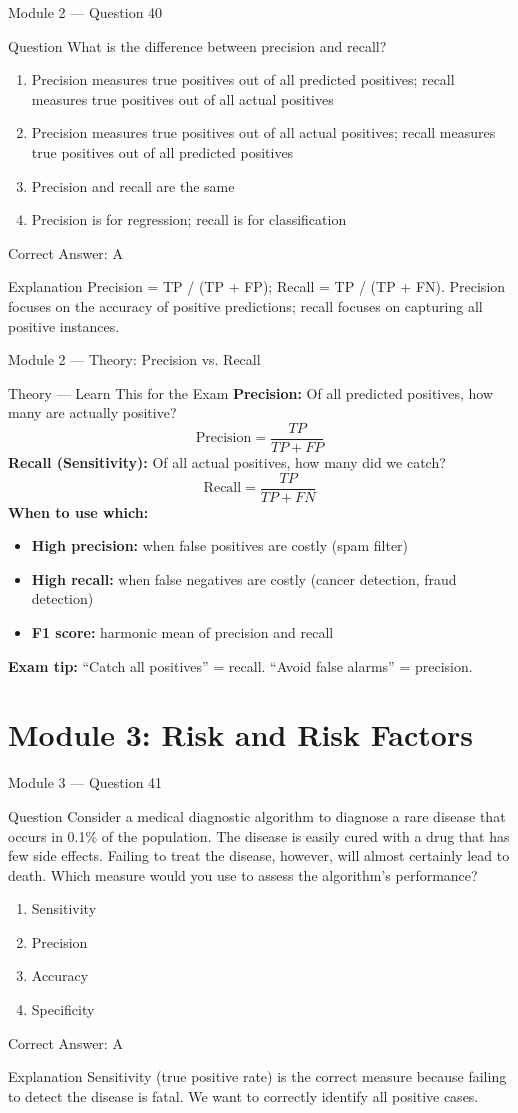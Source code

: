 \documentclass[aspectratio=169,10pt]{beamer}
\newcommand{\question}[1]{%
	\begin{block}{Question}
		#1
	\end{block}
}
\newcommand{\options}[4]{%
	\begin{enumerate}[label=\Alph*.,leftmargin=*]
		\item #1
		\item #2
		\item #3
		\item #4
	\end{enumerate}
}
\newcommand{\answerbox}[1]{%
	\begin{exampleblock}{Correct Answer: #1}
	\end{exampleblock}
}
\newcommand{\explain}[1]{%
	\begin{block}{Explanation}
		\small #1
	\end{block}
}
\newcommand{\theory}[1]{%
	\begin{block}{Theory --- Learn This for the Exam}
		\small #1
	\end{block}
}
\begin{document}
	\begin{frame}{Module 2 --- Question 40}
		\question{What is the difference between precision and recall?}
		\options{Precision measures true positives out of all predicted positives; recall measures true positives out of all actual positives}{Precision measures true positives out of all actual positives; recall measures true positives out of all predicted positives}{Precision and recall are the same}{Precision is for regression; recall is for classification}
		\answerbox{A}
		\explain{Precision = TP / (TP + FP); Recall = TP / (TP + FN). Precision focuses on the accuracy of positive predictions; recall focuses on capturing all positive instances.}
	\end{frame}
	
	\begin{frame}{Module 2 --- Theory: Precision vs. Recall}
		\theory{
			\textbf{Precision:} Of all predicted positives, how many are actually positive?
			\[
			\text{Precision} = \frac{TP}{TP + FP}
			\]
			\textbf{Recall (Sensitivity):} Of all actual positives, how many did we catch?
			\[
			\text{Recall} = \frac{TP}{TP + FN}
			\]
			\textbf{When to use which:}
			\begin{itemize}
				\item \textbf{High precision:} when false positives are costly (spam filter)
				\item \textbf{High recall:} when false negatives are costly (cancer detection, fraud detection)
				\item \textbf{F1 score:} harmonic mean of precision and recall
			\end{itemize}
			\textbf{Exam tip:} ``Catch all positives'' = recall. ``Avoid false alarms'' = precision.
		}
	\end{frame}
	
	\section{Module 3: Risk and Risk Factors}
	
	\begin{frame}{Module 3 --- Question 41}
		\question{Consider a medical diagnostic algorithm to diagnose a rare disease that occurs in 0.1\% of the population. The disease is easily cured with a drug that has few side effects. Failing to treat the disease, however, will almost certainly lead to death. Which measure would you use to assess the algorithm's performance?}
		\options{Sensitivity}{Precision}{Accuracy}{Specificity}
		\answerbox{A}
		\explain{Sensitivity (true positive rate) is the correct measure because failing to detect the disease is fatal. We want to correctly identify all positive cases.}
	\end{frame}
	
\end{document}
